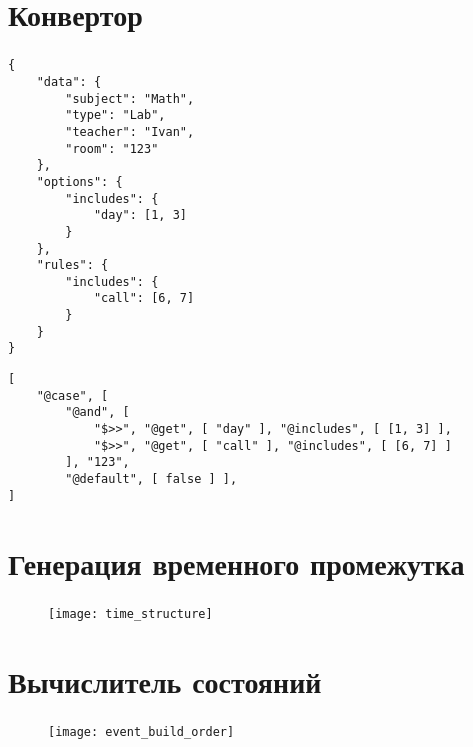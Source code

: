 
\section{Конвертор}

\begin{frame}[fragile]
\frametitle{\insertsection}

    \begin{lstlisting}[basicstyle=\tiny]
{
    "data": {
        "subject": "Math",
        "type": "Lab",
        "teacher": "Ivan",
        "room": "123"
    },
    "options": {
        "includes": {
            "day": [1, 3]
        }
    },
    "rules": {
        "includes": {
            "call": [6, 7]
        }
    }
}
    \end{lstlisting}
\endminipage\hfill
{}
    \begin{lstlisting}[basicstyle=\tiny]
[
    "@case", [
        "@and", [
            "$>>", "@get", [ "day" ], "@includes", [ [1, 3] ],
            "$>>", "@get", [ "call" ], "@includes", [ [6, 7] ]
        ], "123",
        "@default", [ false ] ],
]
    \end{lstlisting}
\endminipage

\end{frame}


\section{Генерация временного промежутка}

\begin{frame}[fragile]
\frametitle{\insertsection}

\begin{figure}
    \center
    \texttt{[image: time\_structure]}
\end{figure}
\end{frame}


\section{Вычислитель состояний}

\begin{frame}
\frametitle{\insertsection}

\vspace{1cm}

\begin{figure}
    \center
    \texttt{[image: event\_build\_order]}
\end{figure}
\end{frame}


